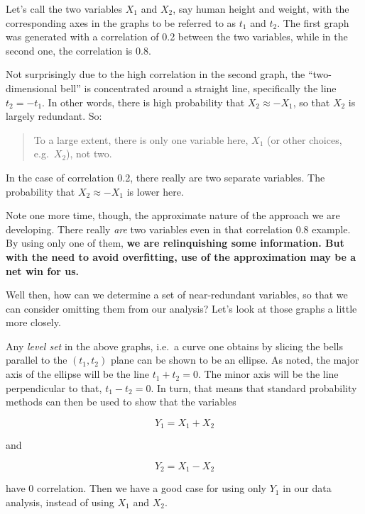 Let's call the two variables $X_1$ and $X_2$, say human height and
weight, with the corresponding axes in the graphs to be referred to as
$t_1$ and $t_2$.  The first graph was generated with a correlation of
0.2 between the two variables, while in the second one, the correlation
is 0.8.

Not surprisingly due to the high correlation in the second graph, the
``two-dimensional bell'' is concentrated around a straight line,
specifically the line $t_2 = - t_1$.  In other words, there is high
probability that $X_2 \approx -X_1$, so that $X_2$ is largely redundant.
So:

\begin{quote}

To a large extent, there is only one variable here, $X_1$ (or other
choices, e.g.\ $X_2$), not two.  

\end{quote}

In the case of correlation 0.2, there really are two separate variables.
The probability that $X_2 \approx -X_1$ is lower here.

Note one more time, though, the approximate nature of the approach we
are developing.  There really \textit{are} two variables even in that
correlation 0.8 example.  By using only one of them, \textbf{we are
relinquishing some information.  But with the need to avoid overfitting,
use of the approximation may be a net win for us.}

Well then, how can we determine a set of near-redundant variables, so
that we can consider omitting them from our analysis?  Let's look at
those graphs a little more closely.

Any \textit{level set} in the above graphs, i.e.\ a curve one
obtains by slicing the bells parallel to the $(t_1,t_2)$ plane can be
shown to be an ellipse.  As noted, the major axis of the ellipse will be
the line $t_1 + t_2 = 0$.  The minor axis will be the line perpendicular
to that, $t_1 - t_2 = 0$.  In turn, that means that standard probability
methods can then be used to show that the variables

\begin{equation}
Y_1 = X_1 + X_2 
\end{equation}

and 

\begin{equation}
Y_2 = X_1 - X_2 
\end{equation}

have 0 correlation.  Then we have a good case for using only $Y_1$ in
our data analysis, instead of using $X_1$ and $X_2$.  

